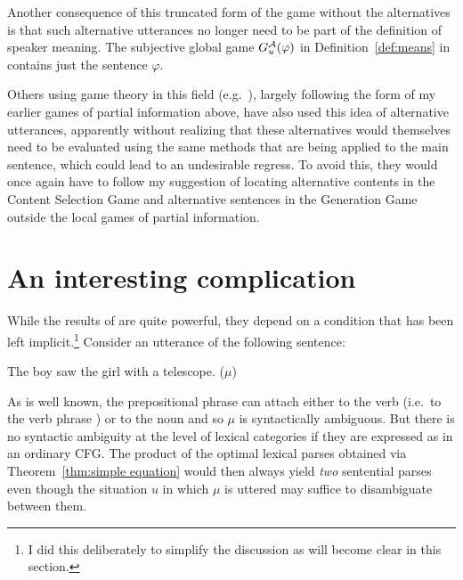 Another consequence of this truncated form of the game without the alternatives is that such alternative utterances no longer need to be part of the definition of speaker meaning. The subjective global game $G^{\cal A}_u(\varphi)$ in Definition~\ref{def:means} in  contains just the sentence $\varphi$.

Others using game theory in this field (e.g.\ \citealt{benz:gtp}), largely following the form of my earlier games of partial information above, have also used this idea of alternative utterances, apparently without realizing that these alternatives would themselves need to be evaluated using the same methods that are being applied to the main sentence, which could lead to an undesirable regress. To avoid this, they would once again have to follow my suggestion of locating alternative contents in the Content Selection Game and alternative sentences in the Generation Game outside the local games of partial information.

\section{An interesting complication}\label{sec:complication}
While the results of  are quite powerful, they depend on a condition that has been left implicit.\footnote{I did this deliberately to simplify the discussion as will become clear in this section.} Consider an utterance of the following sentence:

\begin{exe}
\ex The boy saw the girl with a telescope. ($\mu$)
\end{exe}

\noindent As is well known, the prepositional phrase  can attach either to the verb  (i.e.\ to the verb phrase ) or to the noun  and so $\mu$ is syntactically ambiguous. But there is no syntactic ambiguity at the level of lexical categories if they are expressed as in an ordinary CFG. The product of the optimal lexical parses obtained via Theorem~\ref{thm:simple equation} would then always yield \emph{two} sentential parses even though the situation $u$ in which $\mu$ is uttered may suffice to disambiguate between them.


